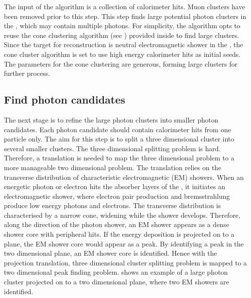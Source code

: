 The input of the \PhotonReconstruction algorithm is a collection of calorimeter hits. Muon clusters have been removed prior to this step.  This step finds large potential photon clusters in the \ECAL, which may contain multiple photons. For simplicity, the algorithm opts to reuse  the cone clustering algorithm (see ) provided inside \pandora to find large clusters. Since the target for reconstruction is neutral electromagnetic shower in the \ECAL, the cone cluster algorithm is set to use high energy calorimeter hits as initial seeds.  The parameters for the cone clustering are generous, forming large clusters for further process.

\subsection{Find photon candidates}
\label{sec:photonCandiate}

The next stage is to refine the large photon clusters into smaller photon candidates. Each photon candidate should contain calorimeter hits from one particle only. The aim for  this step is to split a three dimensional cluster into several smaller clusters. The three dimensional splitting problem is hard. Therefore, a translation is needed to map the three dimensional problem to a more manageable two dimensional problem. The translation relies on the  transverse distribution of characteristic electromagnetic (EM) showers. When an energetic photon or electron hits the absorber layers of the \ECAL, it initiates an electromagnetic shower, where electron pair production and bremsstrahlung produce low energy photons and electrons. The transverse distribution is characterised by a narrow cone, widening while the shower develops. Therefore, along the direction of the photon shower, an  EM shower appears as a dense shower core with peripheral hits. If the energy deposition is projected on to a plane, the EM shower core would appear as a peak. By identifying a peak in the two dimensional plane, an EM shower core is identified.  Hence with the projection translation, three dimensional cluster splitting problem is mapped to a two dimensional peak finding problem.  shows an example of a large photon cluster projected on to a two dimensional plane, where two EM showers are identified.



